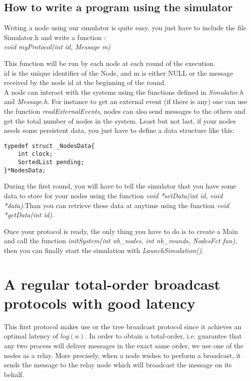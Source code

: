 \documentclass[a4paper]{article}
\begin{document}
\subsection{How to write a program using the simulator}
Writing a node using our simulator is quite easy, you just have to 
include the file Simulator.h and write a function :\\
\textit{void myProtocol(int id, Message m)}

This function will be run by each node at each round of the execution.\\
id is the unique identifier of the Node, and m is either NULL or the
message received by the node id at the beginning of the round.\\
A node can interact with the systems using the functions defined in
\textit{Simulator.h} and \textit{Message.h}. For instance to get an external event
(if there is any) one can use the function \textit{readExternalEvents},
nodes can also send messages to the others and get the total number of
nodes in the system. Least but not last, if your nodes needs some
persistent data, you just have to define a data structure like this:\\
\begin{verbatim}
typedef struct _NodesData{
    int clock;
    SortedList pending;
}*NodesData;
\end{verbatim}
During the first round, you will have to tell the simulator that you
have some data to store for your nodes using the function \textit{void *setData(int id,
void *data)}.Than you can retrieve these data at anytime using the function
\textit{void *getData(int id)}.

Once your protocol is ready, the only thing you have to do is to create
a Main and call the function \textit{initSystem(int nb\_nodes, int
nb\_rounds, NodesFct fun)}, then you can finally start the simulation
with \textit{LaunchSimulation()}. 

\section{A regular total-order broadcast protocols with good latency}
\label{sec:latencyTO}

This first protocol makes use or the tree broadcast protocol since it achieves
an optimal latency of $log(n)$. In order to obtain a total-order, i.e.
guarantee that any two process will deliver messages in the exact same order,
we use one of the nodes as a relay. More precisely, when a node wishes to
perform a broadcast, it sends the message to the relay node which will
broadcast the message on its behalf.
\end{document}
